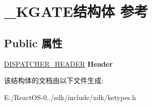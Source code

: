 \hypertarget{struct___k_g_a_t_e}{}\section{\+\_\+\+K\+G\+A\+T\+E结构体 参考}
\label{struct___k_g_a_t_e}
\subsection*{Public 属性}
\begin{DoxyCompactItemize}
\item 
\mbox{\label{struct___k_g_a_t_e_a9c1c5b72a2b42e6e737f00fd7c202428}} 
\hyperlink{struct___d_i_s_p_a_t_c_h_e_r___h_e_a_d_e_r}{D\+I\+S\+P\+A\+T\+C\+H\+E\+R\+\_\+\+H\+E\+A\+D\+ER} {\bfseries Header}
\end{DoxyCompactItemize}


该结构体的文档由以下文件生成\+:\begin{DoxyCompactItemize}
\item 
E\+:/\+React\+O\+S-\/0../sdk/include/xdk/ketypes.\+h\end{DoxyCompactItemize}
